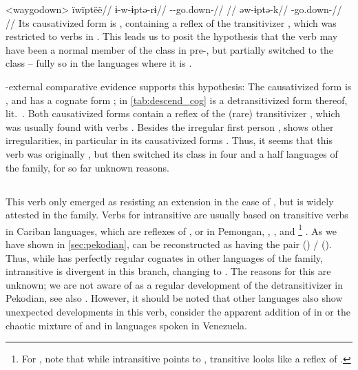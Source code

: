\pex<waygodown>\wayana \parencite[][200]{wayanatavares2005}
\begingl
\glpreamble ïwïptëë//
\gla ɨ-w-ɨptə-rɨ//
\glb {}--go.down-//
\glft {}//
\endgl
{}
\begingl
\gla əw-ɨptə-k//
\glb {}-go.down-//
\glft {}//
\endgl
\xe
%
Its causativized form is  \parencite[255]{wayanatavares2005}, containing a reflex of the transitivizer , which was restricted to  verbs in \PC \parencite{gildea2019overview}.
This leads us to posit the hypothesis that the verb may have been a normal member of the  class in pre-\wayana, but partially switched to the  class -- fully so in the languages where it is .

\wayana-external comparative evidence supports this hypothesis:
The \arara causativized form is  \parencite[66]{alves2017arara}, and \kalina has a cognate form  \parencite[263]{courtz2008carib};   in \cref{tab:descend_cog} is a detransitivized form thereof, lit.\ .
Both causativized forms contain a reflex of the (rare) transitivizer , which was usually found with  verbs \parencite{gildea2019overview}.
Besides the irregular first person , \trio {} shows other irregularities, in particular in its causativized forms \parencite[263]{triomeira1999}.
Thus, it seems that this verb was originally , but then switched its class in four and a half languages of the family, for so far unknown reasons.

\subsection{\PPek {} }
\label{sec:bathe}
This verb only emerged as resisting an extension in the case of \PPek {}, but is widely attested in the family.
Verbs for intransitive  are usually based on transitive verbs in Cariban languages, which are reflexes of , or  in Pemongan, \panare, \kalina, and \maqui\footnote{For \maqui, note that while intransitive  points to , transitive  looks like a reflex of .} .
As we have shown in \cref{sec:pekodian}, \PPek can be reconstructed as having the pair  () /  ().
Thus, while \PPek {} has perfectly regular cognates in other languages of the family, intransitive  is divergent in this branch, changing  to .
The reasons for this are unknown; we are not aware of  as a regular development of the detransitivizer in Pekodian, see also \textcite[506]{meira2010origin}.
However, it should be noted that other languages also show unexpected developments in this verb, consider the apparent addition of  in \hixka or the chaotic mixture of  and  in languages spoken in Venezuela.

